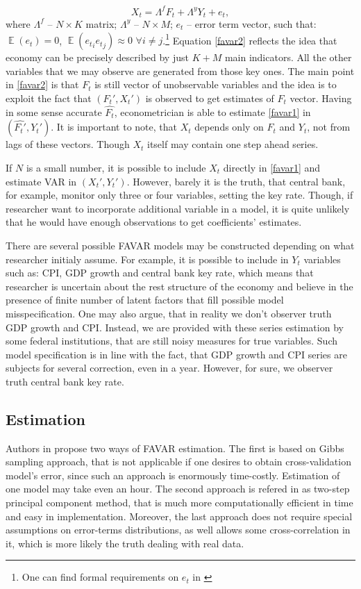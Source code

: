 \documentclass[a4paper, 14pt]{article}
\DeclareMathOperator*{\E}{\mathbb{E}}
\begin{document}
\begin{equation}\label{favar2}
	 X_t = \Lambda^f F_t + \Lambda^y Y_t + e_t,
\end{equation}
where $\Lambda^f$ -- $N \times K$ matrix; $\Lambda^y$ -- $N \times M$; $e_t$ -- error term vector, such that: $\E(e_t) = 0$, $\E({e_t}_i {e_t}_j) \approx 0$ $\forall i \neq j$.\footnote{One can find formal requirements on $e_t$ in \cite{stock2002macroeconomic}} Equation \eqref{favar2} reflects the idea that economy can be precisely described by just $K+M$ main indicators. All the other variables that we may observe are generated from those key ones. The main point in \eqref{favar2} is that $F_t$ is still vector of unobservable variables and the idea is to exploit the fact that $(F_t', X_t')$ is observed to get estimates of $F_t$ vector. Having in some sense accurate $\hat{F_t}$, econometrician is able to estimate \eqref{favar1} in $(\hat{F_t'}, Y_t')$. It is important to note, that $X_t$ depends only on $F_t$ and $Y_t$, not from lags of these vectors. Though $X_t$ itself may contain one step ahead series. 

If $N$ is a small number, it is possible to include $X_t$ directly in \eqref{favar1} and estimate VAR in $({X_t'}, Y_t')$. However, barely it is the truth, that central bank, for example, monitor only three or four variables, setting the key rate. Though, if researcher want to incorporate additional variable in a model, it is quite unlikely that he would have enough observations to get coefficients' estimates. 

There are several possible FAVAR models may be constructed depending on what researcher initialy assume. For example, it is possible to include in $Y_t$ variables such as: CPI, GDP growth and central bank key rate, which means that researcher is uncertain about the rest structure of the economy and believe in the presence of finite number of latent factors that fill possible model misspecification. One may also argue, that in reality we don't observer truth GDP growth and CPI. Instead, we are provided with these series estimation by some federal institutions, that are still noisy measures for true variables. Such model specification is in line with the fact, that GDP growth and CPI series are subjects for several correction, even in a year. However, for sure, we observer truth central bank key rate.

\subsection{Estimation}
Authors in \cite{bernanke2005measuring} propose two ways of FAVAR estimation. The first is based on Gibbs sampling approach, that is not applicable if one desires to obtain cross-validation model's error, since such an approach is enormously time-costly. Estimation of one model may take even an hour.  The second approach is refered in \cite{bernanke2005measuring} as two-step principal component method, that is much more computationally efficient in time and easy in implementation. Moreover, the last approach does not require special assumptions on error-terms distributions, as well allows some cross-correlation in it, which is more likely the truth dealing with real data.
\end{document}
